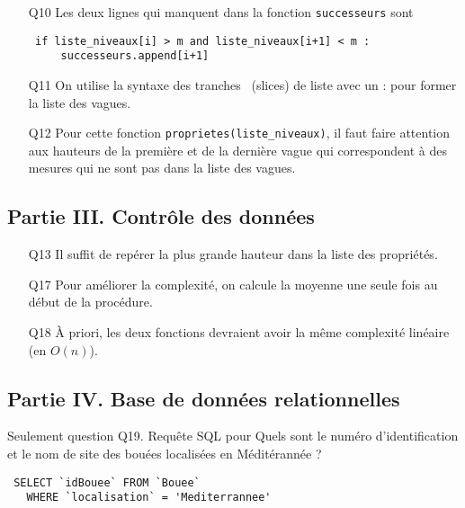 \begin{itemize}
 \item[Q10] Les deux lignes qui manquent dans la fonction \texttt{successeurs} sont
\begin{verbatim}
 if liste_niveaux[i] > m and liste_niveaux[i+1] < m :
     successeurs.append[i+1]
\end{verbatim}

 \item[Q11] On utilise la syntaxe des \og tranches\fg~ (slices) de liste avec un : pour former la liste des vagues.


  \item[Q12] Pour cette fonction \texttt{proprietes(liste\_niveaux)}, il faut faire attention aux hauteurs de la première et de la dernière vague qui correspondent à des mesures qui ne sont pas dans la liste des vagues.

   
\end{itemize}

\subsection*{Partie III. Contrôle des données}
\begin{itemize}
 \item[Q13] Il suffit de repérer la plus grande hauteur dans la liste des propriétés.


 \item[Q17] Pour améliorer la complexité, on calcule la moyenne une seule fois au début de la procédure.
 
 \item[Q18] \`A priori, les deux fonctions devraient avoir la même complexité linéaire (en $O(n)$).
\end{itemize}

\subsection*{Partie IV. Base de données relationnelles}
Seulement question Q19.\newline
Requête SQL pour \og Quels sont le numéro d'identification et le nom de site des bouées localisées en Méditérannée ?\fg
\begin{verbatim}
 SELECT `idBouee` FROM `Bouee` 
   WHERE `localisation` = 'Mediterrannee'
\end{verbatim}

